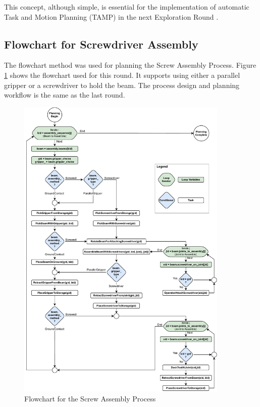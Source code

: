 This concept, although simple, is essential for the implementation of automatic Task and Motion Planning (TAMP) in the next Exploration Round .

\subsection{Flowchart for Screwdriver Assembly}
\label{subsection:exploration-4-flowchart-for-screwdriver-assembly}

The flowchart method  was used for planning the Screw Assembly Process. Figure \ref{fig:flowchart-for-the-screw-assembly-process} shows the flowchart used for this round. It supports using either a parallel gripper or a screwdriver to hold the beam. The process design and planning workflow is the same as the last round.

\begin{figure}[!h]
    \centering
    \includegraphics[width=0.90\textwidth]{images/7a/flowchart-2.pdf}
    \caption{Flowchart for the Screw Assembly Process}
    \label{fig:flowchart-for-the-screw-assembly-process}
\end{figure}

